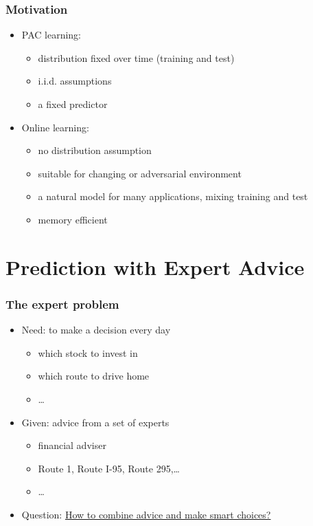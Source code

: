 \documentclass{beamer}
\begin{document}
\begin{frame}
\frametitle{Motivation}
\begin{itemize}
\item PAC learning:
\begin{itemize}
\item distribution fixed over time (training and test)
\item i.i.d. assumptions
\item a fixed predictor 
\end{itemize}
\item Online learning:
\begin{itemize}
\item no distribution assumption
\item suitable for changing or adversarial environment  
\item a natural model for many applications, mixing training and test 
\item memory efficient
\end{itemize}
\end{itemize}
\end{frame}




\section{Prediction with Expert Advice}
\begin{frame}
\frametitle{The expert problem}
\begin{itemize}
\item Need: to make a decision every day
	\begin{itemize}
	\item which stock to invest in
	\item which route to drive home
	\item \ldots
	\end{itemize}
\item Given: advice from a set of experts
	\begin{itemize}
	\item financial adviser
	\item Route 1, Route I-95, Route 295,\ldots
	\item \ldots
	\end{itemize}
\item Question:
	\underline{How to combine advice and make smart choices?}
\end{itemize}

\end{frame}
\end{document}
